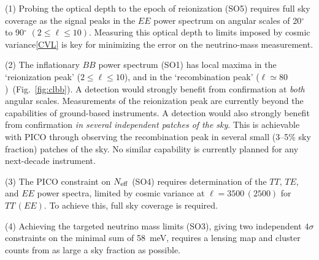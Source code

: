 \documentclass[PICOAPC.tex]{subfiles}
\begin{document}
(1) Probing the optical depth to the epoch of reionization (SO5) requires full sky coverage as the signal peaks in the $EE$ power spectrum on angular scales of 20$^\circ$ to 90$^\circ$ $(2 \leq \ell \leq 10)$. Measuring this optical depth to limits imposed by cosmic variance\cref{CVL} is key for minimizing the error on the neutrino-mass measurement. 

(2) The inflationary $BB$ power spectrum (SO1) has local maxima in the `reionization peak' ($ 2 \leq \ell \leq 10$), and in the `recombination peak' ($ \ell \simeq 80$)~(Fig.~\ref{fig:clbb}). A detection would strongly benefit from confirmation at {\it both} angular scales. Measurements of the reionization peak are currently beyond the capabilities of ground-based instruments. A detection would also strongly benefit from confirmation  {\it in several independent patches of the sky}. This is achievable with PICO through observing the recombination peak in several small (3--5\% sky fraction) patches of the sky. No similar capability is currently planned for any next-decade instrument.  

(3) The PICO constraint on $N_{\rm eff}$ (SO4) requires determination of the $TT,\, TE$, and $EE$ power spectra, limited by cosmic variance at $\ell=3500\,(2500)$ for $TT\,(EE)$. To achieve this, full sky coverage is required.  

(4) Achieving the targeted neutrino mass limits (SO3), giving two independent $4\sigma$ constraints on the minimal sum of 58~meV, requires a lensing map and cluster counts from as large a sky fraction as possible. 
\end{document}
